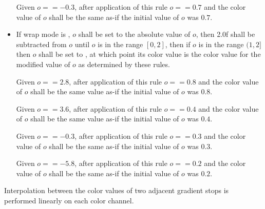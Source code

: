 \begin{enumeratea}
\begin{itemize}
\begin{example}
	Given $o == -0.3$, after application of this rule $o == 0.7$ and the color value of $o$ shall be the same as-if the initial value of $o$ was $0.7$.
	\end{example}
	
	\item If wrap mode is , $o$ shall be set to the absolute value of $o$, then 2.0f shall be subtracted from $o$ until $o$ is in the range $[0,2]$, then if $o$ is in the range $(1,2]$ then $o$ shall be set to , at which point its color value is the color value for the modified value of $o$ as determined by these rules.
	\begin{example}
	Given $o == 2.8$, after application of this rule $o == 0.8$ and the color value of $o$ shall be the same value as-if the initial value of $o$ was $0.8$.
	
	Given $o == 3.6$, after application of this rule $o == 0.4$ and the color value of $o$ shall be the same value as-if the initial value of $o$ was $0.4$.
	
	Given $o == -0.3$, after application of this rule $o == 0.3$ and the color value of $o$ shall be the same as-if the initial value of $o$ was $0.3$.
	
	Given $o == -5.8$, after application of this rule $o == 0.2$ and the color value of $o$ shall be the same as-if the initial value of $o$ was $0.2$.
	\end{example}
	\end{itemize}
\end{enumeratea}

\pnum
Interpolation between the color values of two adjacent gradient stops is performed linearly on each color channel.
